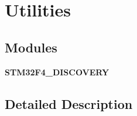 \section{Utilities}
\label{group__Utilities}
\subsection*{Modules}
\begin{DoxyCompactItemize}
\item 
\textbf{ S\+T\+M32\+F4\+\_\+\+D\+I\+S\+C\+O\+V\+E\+RY}
\end{DoxyCompactItemize}


\subsection{Detailed Description}
